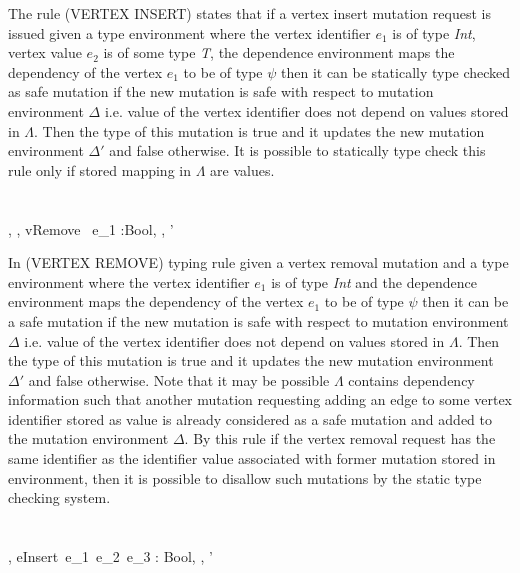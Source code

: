 The rule (VERTEX INSERT) states that if a vertex insert mutation request is issued given a type environment where the vertex identifier $e_1$ is of type \emph{Int}, vertex value $e_2$ is of some type \emph{T}, the dependence environment maps the dependency of the vertex $e_1$ to be of type $\psi$ then it can be statically type checked as safe mutation if the new mutation is safe with respect to mutation environment $\Delta$ i.e. value of the vertex identifier does not depend on values stored in $\Lambda$. Then the type of this mutation is true and it updates the new mutation environment $\Delta'$ and false otherwise. It is possible to statically type check this rule only if stored mapping in $\Lambda$ are values.\\    
\ \\
\ \\    
    {\Gamma, \Lambda, \Delta \vdash vRemove \ e_1 :Bool, \Lambda, \Delta'}

\smallskip

In (VERTEX REMOVE) typing rule given a vertex removal mutation and a type environment where the vertex identifier $e_1$ is of type \emph{Int} and the dependence environment maps the dependency of the vertex $e_1$ to be of type $\psi$ then it can be a safe mutation if the new mutation is safe with respect to mutation environment $\Delta$ i.e. value of the vertex identifier does not depend on values stored in $\Lambda$. Then the type of this mutation is true and it updates the new mutation environment $\Delta'$ and false otherwise. Note that it may be possible $\Lambda$ contains dependency information such that another mutation requesting adding an edge to some vertex identifier stored as value is already considered as a safe mutation and added to the mutation environment $\Delta$. By this rule if the vertex removal request has the same identifier as the identifier value associated with former mutation stored in environment, then it is possible to disallow such mutations by the static type checking system.\\    
\ \\
\ \\         
    {\Gamma, \Lambda \Delta \vdash eInsert\ e_1\ e_2\ e_3 : Bool, \Lambda, \Delta'}

